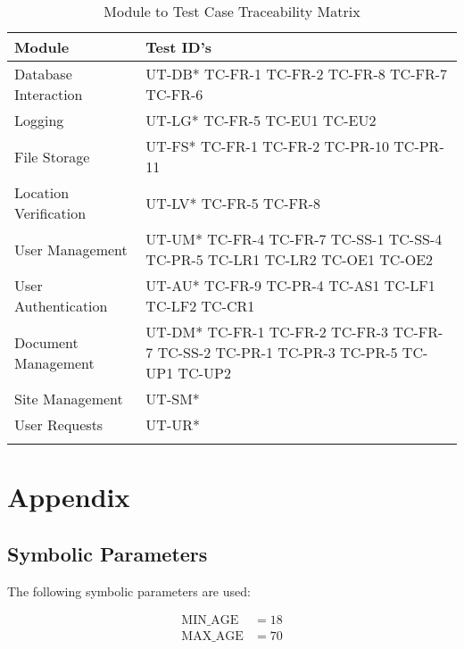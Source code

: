 \documentclass[12pt, titlepage]{article}
\begin{document}
\begin{longtable}{|m{5cm}|m{9cm}|}
  \hline
  \textbf{Module} & \textbf{Test ID's} \\
  \hline
  Database Interaction & UT-DB* TC-FR-1 TC-FR-2 TC-FR-8 TC-FR-7 TC-FR-6\\ \hline
  Logging & UT-LG* TC-FR-5 TC-EU1 TC-EU2\\ \hline
  File Storage & UT-FS* TC-FR-1 TC-FR-2 TC-PR-10 TC-PR-11\\ \hline
  Location Verification & UT-LV* TC-FR-5 TC-FR-8\\ \hline
  User Management & UT-UM* TC-FR-4 TC-FR-7 TC-SS-1 TC-SS-4 TC-PR-5
  TC-LR1 TC-LR2 TC-OE1 TC-OE2 \\ \hline
  User Authentication & UT-AU* TC-FR-9 TC-PR-4 TC-AS1 TC-LF1 TC-LF2
  TC-CR1\\ \hline
  Document Management & UT-DM* TC-FR-1 TC-FR-2 TC-FR-3 TC-FR-7
  TC-SS-2 TC-PR-1 TC-PR-3 TC-PR-5 TC-UP1 TC-UP2\\ \hline
  Site Management & UT-SM*\\ \hline
  User Requests & UT-UR*\\ \hline
  \caption{Module to Test Case Traceability Matrix}
\end{longtable}

\newpage





\newpage

\section{Appendix}

\subsection{Symbolic Parameters}
The following symbolic parameters are used:

\begin{align*}
  \text{MIN\_AGE} &= 18\\
  \text{MAX\_AGE} &= 70\\
\end{align*}
\end{document}
